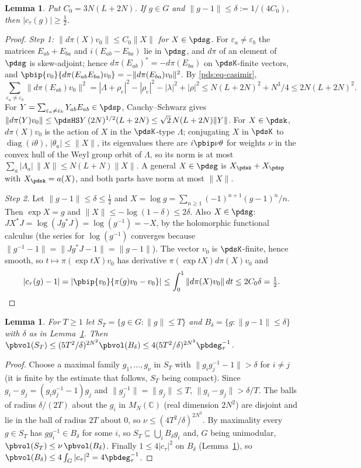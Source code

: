 \documentclass[10pt]{amsart}
\newtheorem{lemma}[theorem]{Lemma}
\theoremstyle{definition}
\theoremstyle{remark}
\newcommand{\C}{\mathbb C}
\begin{document}
\begin{lemma}\label{pds:lip}
Put $C_0=3N(L+2N)$. If $g\in G$ and $\|g-1\|\le\delta:=1/(4C_0)$, then $|c_\tau(g)|\ge\frac12$.
\end{lemma}
\begin{proof}
\emph{Step 1: $\|d\pi(X)v_0\|\le C_0\|X\|$ for $X\in\pdsg$.} For $\varepsilon_a\ne\varepsilon_b$ the
matrices $E_{ab}+E_{ba}$ and $i(E_{ab}-E_{ba})$ lie in $\pdsg$, and $d\pi$ of an element of $\pdsg$ is
skew-adjoint; hence $d\pi(E_{ab})^*=-d\pi(E_{ba})$ on $\pdsK$-finite vectors, and
$\pbip{v_0}{d\pi(E_{ab}E_{ba})v_0}=-\|d\pi(E_{ba})v_0\|^2$. By \eqref{pds:eq-casimir},
\[
\sum_{\varepsilon_a\ne\varepsilon_b}\|d\pi(E_{ab})v_0\|^2=|\Lambda+\rho_{\mathrm c}|^2-
|\rho_{\mathrm c}|^2-|\lambda|^2+|\rho|^2\le N(L+2N)^2+N^3/4\le2N(L+2N)^2 .
\]
For $Y=\sum_{\varepsilon_a\ne\varepsilon_b}Y_{ab}E_{ab}\in\pdsp$, Cauchy--Schwarz gives $\|d\pi(Y)v_0\|
\le\pdsHS Y\,(2N)^{1/2}(L+2N)\le\sqrt2\,N(L+2N)\|Y\|$. For $X\in\pdsk$, $d\pi(X)v_0$ is the action of
$X$ in the $\pdsK$-type $\Lambda$; conjugating $X$ in $\pdsK$ to $\operatorname{diag}(i\theta)$,
$|\theta_a|\le\|X\|$, its eigenvalues there are $i\pbip\nu\theta$ for weights $\nu$ in the convex hull
of the Weyl group orbit of $\Lambda$, so its norm is at most $\sum_a|\Lambda_a|\,\|X\|\le N(L+N)\|X\|$.
A general $X\in\pdsg$ is $X_{\pdsk}+X_{\pdsp}$ with $X_{\pdsk}=a(X)$, and both parts have norm at
most $\|X\|$.

\emph{Step 2.} Let $\|g-1\|\le\delta\le\frac12$ and $X=\log g=\sum_{n\ge1}(-1)^{n+1}(g-1)^n/n$. Then
$\exp X=g$ and $\|X\|\le-\log(1-\delta)\le2\delta$. Also $X\in\pdsg$: $JX^*J=\log(Jg^*J)=\log(g^{-1})=
-X$, by the holomorphic functional calculus (the series for $\log(g^{-1})$ converges because
$\|g^{-1}-1\|=\|Jg^*J-1\|=\|g-1\|$). The vector $v_0$ is $\pdsK$-finite, hence smooth, so
$t\mapsto\pi(\exp tX)v_0$ has derivative $\pi(\exp tX)d\pi(X)v_0$ and
\[
|c_\tau(g)-1|=|\pbip{v_0}{\pi(g)v_0-v_0}|\le\int_0^1\|d\pi(X)v_0\|\,dt\le2C_0\delta=\tfrac12 .
\qedhere
\]
\end{proof}

\begin{lemma}\label{pds:balls}
For $T\ge1$ let $S_T=\{g\in G:\|g\|\le T\}$ and $B_\delta=\{g:\|g-1\|\le\delta\}$ with $\delta$ as in
Lemma~\ref{pds:lip}. Then $\pbvol(S_T)\le(5T^2/\delta)^{2N^2}\pbvol(B_\delta)\le4(5T^2/\delta)^{2N^2}
\pbdeg_\tau^{-1}$.
\end{lemma}
\begin{proof}
Choose a maximal family $g_1,\dots,g_\nu$ in $S_T$ with $\|g_ig_j^{-1}-1\|>\delta$ for $i\ne j$ (it is
finite by the estimate that follows, $S_T$ being compact). Since $g_i-g_j=(g_ig_j^{-1}-1)g_j$ and
$\|g_j^{-1}\|=\|g_j\|\le T$, $\|g_i-g_j\|>\delta/T$. The balls of radius $\delta/(2T)$ about the $g_i$
in $M_N(\C)$ (real dimension $2N^2$) are disjoint and lie in the ball of radius $2T$ about $0$, so
$\nu\le(4T^2/\delta)^{2N^2}$. By maximality every $g\in S_T$ has $gg_i^{-1}\in B_\delta$ for some $i$,
so $S_T\subseteq\bigcup_iB_\delta g_i$ and, $G$ being unimodular, $\pbvol(S_T)\le\nu\,\pbvol(B_\delta)$.
Finally $1\le4|c_\tau|^2$ on $B_\delta$ (Lemma~\ref{pds:lip}), so $\pbvol(B_\delta)\le4\int_G|c_\tau|^2
=4\pbdeg_\tau^{-1}$.
\end{proof}
\end{document}
